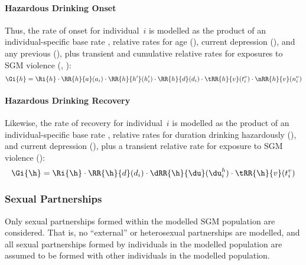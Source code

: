 \paragraph{Hazardous Drinking Onset}
Thus, the rate of \hazdrink onset for individual~$i$
is modelled as the product of
an individual-specific base rate ,
relative rates for age (),
current depression (),
and any previous \hazdrink (), plus
transient and cumulative relative rates for exposures to SGM violence
(, ):
\begin{equation}
  \Gi{h} = \Ri{h}
     \cdot \RR{h}{a}(a_i)
     \cdot \RR{h}{h'}(h'_i)
     \cdot \RR{h}{d}(d_i)
     \cdot \tRR{h}{v}(t^v_i)
     \cdot \nRR{h}{v}(n^v_i)
\end{equation}
\paragraph{Hazardous Drinking Recovery}
Likewise, the rate of \hazdrink recovery for individual~$i$
is modelled as the product of
an individual-specific base rate \Ri{\h},
relative rates for duration drinking hazardously (\dRR{\h}{\du}),
and current depression (), plus
a transient relative rate for exposure to SGM violence ():
\begin{equation}
  \Gi{\h} = \Ri{\h}
    \cdot \RR{\h}{d}(d_i)
    \cdot \dRR{\h}{\du}(\du^h_i)
    \cdot \tRR{\h}{v}(t^v_i)
\end{equation}
\subsubsection{Sexual Partnerships}\label{mod.par.evt.ptr}
Only sexual partnerships formed within the modelled SGM population are considered.
That is, no ``external'' or heterosexual partnerships are modelled,
and all sexual partnerships formed by individuals in the modelled population
are assumed to be formed with other individuals in the modelled population.

